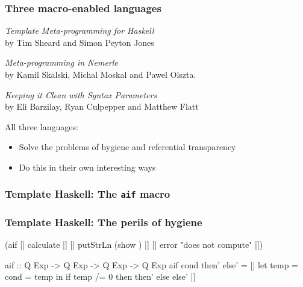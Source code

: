 \documentclass[hyperref={bookmarks=false}]{beamer}
\begin{document}
\begin{frame}[fragile]
\frametitle{Three macro-enabled languages}

\emph{Template Meta-programming for Haskell} \text{\color{blue}{[Template Haskell]}}\\
by Tim Sheard and Simon Peyton Jones

\vskip15pt

\emph{Meta-programming in Nemerle} \text{\color{blue}{[Nemerle]}}\\
by Kamil Skalski, Michal Moskal and Pawel Olszta.

\vskip15pt

\emph{Keeping it Clean with Syntax Parameters} \text{\color{blue}{[Racket]}}\\
by Eli Barzilay, Ryan Culpepper and Matthew Flatt

\vskip15pt

All three languages:
\begin{itemize}
\item Solve the problems of hygiene and referential transparency
\item Do this in their own interesting ways
\end{itemize}
\end{frame}

\begin{frame}[fragile]
\frametitle<1>{Template Haskell: The \texttt{aif} macro}
\frametitle<2>{Template Haskell: The perils of hygiene}
\begin{semiverbatim}
{\textdollar}(aif [| calculate |]
  [| putStrLn (show ) |]
  [| error "does not compute" |])

aif :: Q Exp -> Q Exp -> Q Exp -> Q Exp
aif cond then' else' =
  [| let temp = {\textdollar}cond
          = temp
     in if temp /= 0 then {\textdollar}then' else {\textdollar}else' |]


\end{semiverbatim}
\end{frame}
\end{document}
